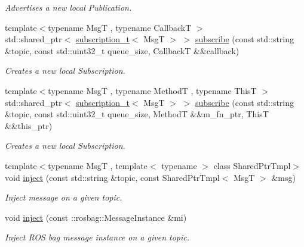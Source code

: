 \begin{DoxyCompactItemize}
\begin{DoxyCompactList}\small\item\em Advertises a new local Publication. \end{DoxyCompactList}\item 
{\footnotesize template$<$typename MsgT , typename CallbackT $>$ }\\std\+::shared\+\_\+ptr$<$ \hyperlink{classflow__ros_1_1routing_1_1_local_subscription}{subscription\+\_\+t}$<$ MsgT $>$ $>$ \hyperlink{classflow__ros_1_1_router_a6f8d999bfe280549f4a3216205007450}{subscribe} (const std\+::string \&topic, const std\+::uint32\+\_\+t queue\+\_\+size, CallbackT \&\&callback)
\begin{DoxyCompactList}\small\item\em Creates a new local Subscription. \end{DoxyCompactList}\item 
{\footnotesize template$<$typename MsgT , typename MethodT , typename ThisT $>$ }\\std\+::shared\+\_\+ptr$<$ \hyperlink{classflow__ros_1_1routing_1_1_local_subscription}{subscription\+\_\+t}$<$ MsgT $>$ $>$ \hyperlink{classflow__ros_1_1_router_a00e52e1f0df24ff0ca4b2f80d5b6fd0d}{subscribe} (const std\+::string \&topic, const std\+::uint32\+\_\+t queue\+\_\+size, MethodT \&\&m\+\_\+fn\+\_\+ptr, ThisT \&\&this\+\_\+ptr)
\begin{DoxyCompactList}\small\item\em Creates a new local Subscription. \end{DoxyCompactList}\item 
{\footnotesize template$<$typename MsgT , template$<$ typename $>$ class Shared\+Ptr\+Tmpl$>$ }\\void \hyperlink{classflow__ros_1_1_router_ae41d76f1feb66cd4302172d42253454c}{inject} (const std\+::string \&topic, const Shared\+Ptr\+Tmpl$<$ MsgT $>$ \&msg)
\begin{DoxyCompactList}\small\item\em Inject message on a given topic. \end{DoxyCompactList}\item 
void \hyperlink{classflow__ros_1_1_router_a9a6615abdc9e1091c73acc86fcbf795c}{inject} (const \+::rosbag\+::\+Message\+Instance \&mi)
\begin{DoxyCompactList}\small\item\em Inject R\+OS bag message instance on a given topic. \end{DoxyCompactList}\item 

\end{DoxyCompactItemize}
